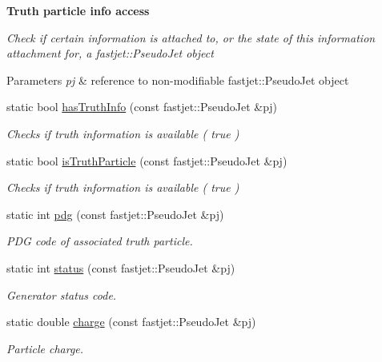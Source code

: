 \begin{Indent}{\bf Truth particle info access}\par
{\em Check if certain information is attached to, or the state of this information attachment for, a {\ttfamily fastjet\+::\+Pseudo\+Jet} object


\begin{DoxyParams}{Parameters}
{\em pj} & reference to non-\/modifiable {\ttfamily fastjet\+::\+Pseudo\+Jet} object \\
\hline
\end{DoxyParams}
}\begin{DoxyCompactItemize}
\item 
static bool \hyperlink{structAnalysisHelper_1_1FastJet_a7f2d471a8532314e77e7aa09b0d910be}{has\+Truth\+Info} (const fastjet\+::\+Pseudo\+Jet \&pj)
\begin{DoxyCompactList}\small\item\em Checks if truth information is available ( {\ttfamily true} ) \end{DoxyCompactList}\item 
static bool \hyperlink{structAnalysisHelper_1_1FastJet_a3486c68b6851741bba9066ad03f15a05}{is\+Truth\+Particle} (const fastjet\+::\+Pseudo\+Jet \&pj)
\begin{DoxyCompactList}\small\item\em Checks if truth information is available ( {\ttfamily true} ) \end{DoxyCompactList}\item 
static int \hyperlink{structAnalysisHelper_1_1FastJet_a027968b8c18bfb098f88308d81cf39ea}{pdg} (const fastjet\+::\+Pseudo\+Jet \&pj)
\begin{DoxyCompactList}\small\item\em P\+DG code of associated truth particle. \end{DoxyCompactList}\item 
static int \hyperlink{structAnalysisHelper_1_1FastJet_ac9110679d145b63a2f755de051ea4974}{status} (const fastjet\+::\+Pseudo\+Jet \&pj)
\begin{DoxyCompactList}\small\item\em Generator status code. \end{DoxyCompactList}\item 
static double \hyperlink{structAnalysisHelper_1_1FastJet_ac94926cb2fb936c40fcf88c149785b2f}{charge} (const fastjet\+::\+Pseudo\+Jet \&pj)
\begin{DoxyCompactList}\small\item\em Particle charge. \end{DoxyCompactList}\item 

\end{DoxyCompactItemize}
\end{Indent}
